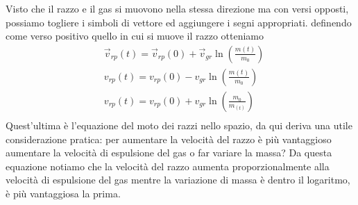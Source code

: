 Visto che il razzo e il gas si muovono nella stessa direzione ma con versi opposti, possiamo togliere i simboli di vettore ed aggiungere i segni appropriati. definendo come verso positivo quello in cui si muove il razzo otteniamo
\begin{align*}
&\vec{v}_{rp}(t) = \vec{v}_{rp}(0)+ \vec{v}_{gr} \ln(\frac{m(t)}{m_0})\\
&{v}_{rp}(t) = {v}_{rp}(0)- {v}_{gr} \ln(\frac{m(t)}{m_0})\\
&{v}_{rp}(t) = {v}_{rp}(0)+ {v}_{gr} \ln(\frac{m_0}{m_(t)})\\
\end{align*}
Quest'ultima è l'equazione del moto dei razzi nello spazio, da qui deriva una utile considerazione pratica: per aumentare la velocità del razzo è più vantaggioso aumentare la velocità di espulsione del gas o far variare la massa? Da questa equazione notiamo che la velocità del razzo aumenta proporzionalmente alla velocità di espulsione del gas mentre la variazione di massa è dentro il logaritmo, è più vantaggiosa la prima. 

